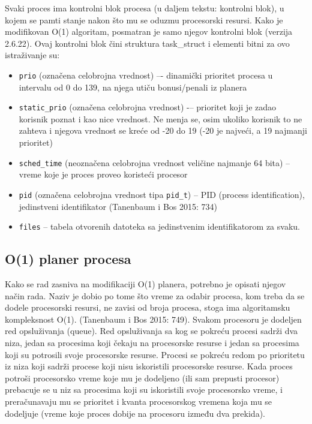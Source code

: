 Svaki proces ima kontrolni blok procesa (u daljem tekstu: kontrolni blok), u kojem se pamti stanje nakon što mu se oduzmu procesorski resursi. Kako je modifikovan O(1) algoritam, posmatran je samo njegov kontrolni blok (verzija 2.6.22).  Ovaj kontrolni blok čini struktura task\_struct i elementi bitni za ovo istraživanje su:

\begin{itemize}
    \item \texttt{prio} (označena celobrojna vrednost) –- dinamički prioritet procesa u intervalu od 0 do 139, na njega utiču bonusi/penali iz planera
    \item \texttt{static\_prio} (označena celobrojna vrednost) -– prioritet koji je zadao korisnik poznat i kao nice vrednost. Ne menja se, osim ukoliko korisnik to ne zahteva i njegova vrednost se kreće od -20 do 19 (-20 je najveći, a 19 najmanji prioritet)
    \item \texttt{sched\_time} (neoznačena celobrojna vrednost veličine najmanje 64 bita) – vreme koje je proces proveo koristeći procesor
    \item \texttt{pid} (označena celobrojna vrednost tipa \texttt{pid\_t}) – PID (process identification), jedinstveni identifikator (Tanenbaum i Bos 2015: 734)
    \item \texttt{files} – tabela otvorenih datoteka sa jedinstvenim identifikatorom za svaku.
\end{itemize}

\subsection{O(1) planer procesa}

Kako se rad zasniva na modifikaciji O(1) planera, potrebno je opisati njegov način rada.
Naziv je dobio po tome što vreme za odabir procesa, kom treba da se dodele procesorski
resursi, ne zavisi od broja procesa, stoga ima algoritamsku kompleksnost O(1). (Tanenbaum i
Bos 2015: 749). Svakom procesoru je dodeljen red opsluživanja (queue). Red opsluživanja sa
kog se pokreću procesi sadrži dva niza, jedan sa procesima koji čekaju na procesorske resurse
i jedan sa procesima koji su potrosili svoje procesorske resurse. Procesi se pokreću redom po
prioritetu iz niza koji sadrži procese koji nisu iskoristili procesorske resurse. Kada proces
potroši procesorsko vreme koje mu je dodeljeno (ili sam prepusti procesor) prebacuje se u niz
sa procesima koji su iskoristili svoje procesorsko vreme, i preračunavaju mu se prioritet i
kvanta procesorskog vremena koja mu se dodeljuje (vreme koje proces dobije na procesoru
između dva prekida).

